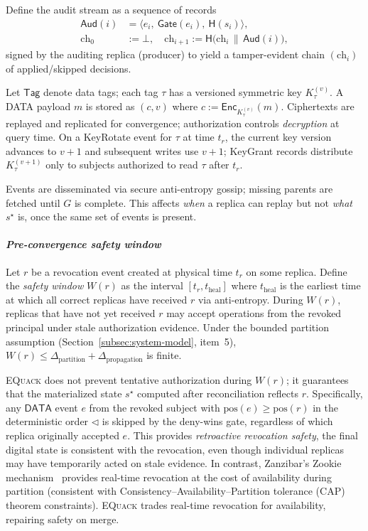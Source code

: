 \documentclass[10pt,journal,compsoc]{IEEEtran}
\newcommand{\equack}{\textsc{EQuack}}
\begin{document}
\medskip
Define the audit stream as a sequence of records
\[
\begin{aligned}
\mathsf{Aud}(i) &= \big\langle e_i,\ \mathsf{Gate}(e_i),\ \mathsf{H}(s_i)\big\rangle,\\
\mathrm{ch}_0 &:= \bot,\quad
\mathrm{ch}_{i+1} := \mathsf{H}\!\big(\mathrm{ch}_i \,\|\, \mathsf{Aud}(i)\big),
\end{aligned}
\]
signed by the auditing replica (producer) to yield a tamper-evident chain $(\mathrm{ch}_i)$ of applied/skipped decisions.

\medskip
Let $\mathsf{Tag}$ denote data tags; each tag $\tau$ has a versioned symmetric key $K_{\tau}^{(v)}$. A DATA payload $m$ is stored as $(c,v)$ where $c := \mathsf{Enc}_{K_{\tau}^{(v)}}(m)$. Ciphertexts are replayed and replicated for convergence; authorization controls \emph{decryption} at query time. On a KeyRotate event for $\tau$ at time $t_r$, the current key version advances to $v{+}1$ and subsequent writes use $v{+}1$; KeyGrant records distribute $K_{\tau}^{(v+1)}$ only to subjects authorized to read $\tau$ after $t_r$.

Events are disseminated via secure anti-entropy gossip; missing parents are fetched until $G$ is complete.
This affects \emph{when} a replica can replay but not \emph{what} $s^\star$ is, once the same set of events is present.

\paragraph*{\textit{Pre-convergence safety window}} Let $r$ be a revocation event created at physical time $t_r$ on some replica. Define the \emph{safety window} $W(r)$ as the interval $[t_r, t_{\text{heal}}]$ where $t_{\text{heal}}$ is the earliest time at which all correct replicas have received $r$ via anti-entropy. During $W(r)$, replicas that have not yet received $r$ may accept operations from the revoked principal under stale authorization evidence. Under the bounded partition assumption (Section~\ref{subsec:system-model}, item~5), $W(r) \leq \Delta_{\text{partition}} + \Delta_{\text{propagation}}$ is finite.

\equack{} does not prevent tentative authorization during $W(r)$; it guarantees that the materialized state $s^\star$ computed after reconciliation reflects $r$. Specifically, any $\mathsf{DATA}$ event $e$ from the revoked subject with $\mathrm{pos}(e) \geq \mathrm{pos}(r)$ in the deterministic order $\triangleleft$ is skipped by the deny-wins gate, regardless of which replica originally accepted $e$. This provides \emph{retroactive revocation safety}, the final digital state is consistent with the revocation, even though individual replicas may have temporarily acted on stale evidence. In contrast, Zanzibar's Zookie mechanism~\cite{zanzibar2019} provides real-time revocation at the cost of availability during partition (consistent with Consistency--Availability--Partition tolerance (CAP) theorem constraints). \equack{} trades real-time revocation for availability, repairing safety on merge.
\end{document}
